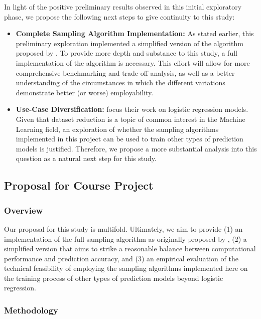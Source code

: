 \documentclass{article}
\theoremstyle{plain}
\theoremstyle{definition}
\theoremstyle{remark}
\begin{document}
In light of the positive preliminary results observed in this initial exploratory phase, we propose the following next steps to give continuity to this study:
\begin{itemize}

 \item \textbf{Complete Sampling Algorithm Implementation:} As stated earlier, this preliminary exploration implemented a simplified version of the algorithm proposed by \citeauthor{chow24}. To provide more depth and substance to this study, a full implementation of the algorithm is necessary. This effort will allow for more comprehensive benchmarking and trade-off analysis, as well as a better understanding of the circumstances in which the different variations demonstrate better (or worse) employability.

\item \textbf{Use-Case Diversification:} \citeauthor{chow24} focus their work on logistic regression models. Given that dataset reduction is a topic of common interest in the Machine Learning field, an exploration of whether the sampling algorithms implemented in this project can be used to train other types of prediction models is justified. Therefore, we propose a more substantial analysis into this question as a natural next step for this study.

\end{itemize}


\subsection{Proposal for Course Project}

\subsubsection{Overview}

Our proposal for this study is multifold. Ultimately, we aim to provide (1) an implementation of the full sampling algorithm as originally proposed by \citeauthor{chow24}, (2) a simplified version that aims to strike a reasonable balance between computational performance and prediction accuracy, and (3) an empirical evaluation of the technical feasibility of employing the sampling algorithms implemented here on the training process of other types of prediction models beyond logistic regression.

\subsubsection{Methodology}
\end{document}
